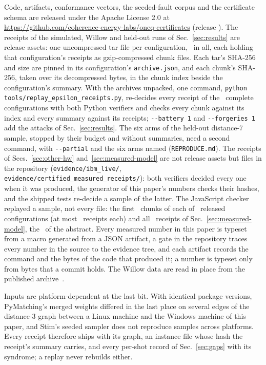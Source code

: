 \documentclass[aps,pra,twocolumn,superscriptaddress,nofootinbib,longbibliography,floatfix]{revtex4-2}
\begin{document}
Code, artifacts, conformance vectors, the seeded-fault corpus and the certificate schema are released under the Apache License 2.0 at \url{https://github.com/coherence-energy-labs/oneq-certificates} (release \ReleaseTag). The receipts of the simulated, Willow and held-out runs of Sec.~\ref{sec:results} are release assets: one uncompressed tar file per configuration, \ReplayArchives\ in all, each holding that configuration's receipts as gzip-compressed chunk files. Each tar's SHA-256 and size are pinned in its configuration's \texttt{archive.json}, and each chunk's SHA-256, taken over its decompressed bytes, in the chunk index beside the configuration's summary. With the archives unpacked, one command, \texttt{python} \texttt{tools/replay\_epsilon\_receipts.py}, re-decides every receipt of the \ReplayArchivesComplete\ complete configurations with both Python verifiers and checks every chunk against its index and every summary against its receipts; \texttt{-{}-battery 1} and \texttt{-{}-forgeries 1} add the attacks of Sec.~\ref{sec:results}. The six arms of the held-out distance-7 sample, stopped by their budget and without summaries, need a second command, with \texttt{-{}-partial} and the six arms named (\nolinkurl{REPRODUCE.md}). The receipts of Secs.~\ref{sec:other-hw} and~\ref{sec:measured-model} are not release assets but files in the repository (\nolinkurl{evidence/ibm_live/}, \nolinkurl{evidence/certified_measured_receipts/}): both verifiers decided every one when it was produced, the generator of this paper's numbers checks their hashes, and the shipped tests re-decide a sample of the latter. The JavaScript checker replayed a sample, not every file: the first \JsReplayChunksPerConfig\ chunks of each of \JsReplayConfigs\ released configurations (at most \JsReplayMaxPerConfig\ receipts each) and all \JsReplayMeasured\ receipts of Sec.~\ref{sec:measured-model}, the \JsReplayReceipts\ of the abstract. Every measured number in this paper is typeset from a macro generated from a JSON artifact, a gate in the repository traces every number in the source to the evidence tree, and each artifact records the command and the bytes of the code that produced it; a number is typeset only from bytes that a commit holds. The Willow data are read in place from the published archive~\cite{google2024data}.

Inputs are platform-dependent at the last bit. With identical package versions, PyMatching's merged weights differed in the last place on several edges of the distance-3 graph between a Linux machine and the Windows machine of this paper, and Stim's seeded sampler does not reproduce samples across platforms. Every receipt therefore ships with its graph, an instance file whose hash the receipt's summary carries, and every per-shot record of Sec.~\ref{sec:gaps} with its syndrome; a replay never rebuilds either.
\end{document}
